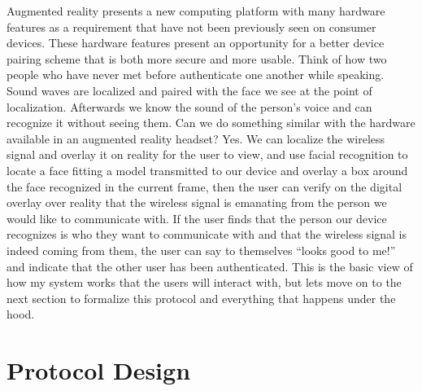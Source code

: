 \documentclass[12pt,dvips]{report}
\begin{document}
Augmented reality presents a new computing platform with many hardware features as a requirement that have not been previously seen on consumer devices. These hardware features present an opportunity for a better device pairing scheme that is both more secure and more usable. Think of how two people who have never met before authenticate one another while speaking. Sound waves are localized and paired with the face we see at the point of localization. Afterwards we know the sound of the person's voice and can recognize it without seeing them. Can we do something similar with the hardware available in an augmented reality headset? Yes. We can localize the wireless signal and overlay it on reality for the user to view, and use facial recognition to locate a face fitting a model transmitted to our device and overlay a box around the face recognized in the current frame, then the user can verify on the digital overlay over reality that the wireless signal is emanating from the person we would like to communicate with. If the user finds that the person our device recognizes is who they want to communicate with and that the wireless signal is indeed coming from them, the user can say to themselves ``looks good to me!'' and indicate that the other user has been authenticated. This is the basic view of how my system works that the users will interact with, but lets move on to the next section to formalize this protocol and everything that happens under the hood.



\chapter{Protocol Design}
%
\end{document}
